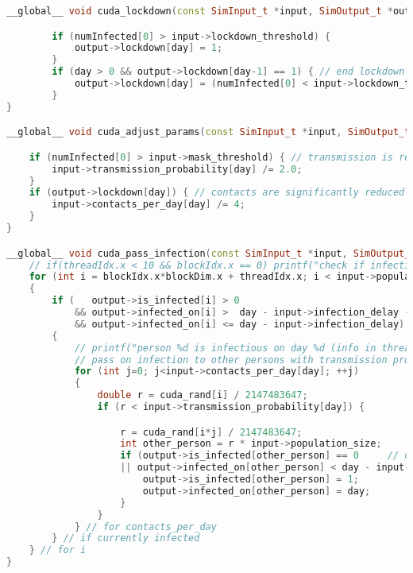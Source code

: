 \begin{lstlisting}[language=C++, title=C++ code for ]
__global__ void cuda_lockdown(const SimInput_t *input, SimOutput_t *output, int *numInfected, int day) {

        if (numInfected[0] > input->lockdown_threshold) {
            output->lockdown[day] = 1;
        }
        if (day > 0 && output->lockdown[day-1] == 1) { // end lockdown if number of infections has reduced significantly
            output->lockdown[day] = (numInfected[0] < input->lockdown_threshold / 3) ? 0 : 1;
        }
}

__global__ void cuda_adjust_params(const SimInput_t *input, SimOutput_t *output, int *numInfected, int day) {

    if (numInfected[0] > input->mask_threshold) { // transmission is reduced with masks. Arbitrary factor: 2
        input->transmission_probability[day] /= 2.0;
    }
    if (output->lockdown[day]) { // contacts are significantly reduced in lockdown. Arbitrary factor: 4
        input->contacts_per_day[day] /= 4;
    }
}

__global__ void cuda_pass_infection(const SimInput_t *input, SimOutput_t *output, u_int32_t *cuda_rand, int day){
    // if(threadIdx.x < 10 && blockIdx.x == 0) printf("check if infectious: person = %d, yes/no = %d\n", threadIdx.x, output->is_infected[threadIdx.x]);
    for (int i = blockIdx.x*blockDim.x + threadIdx.x; i < input->population_size; i += gridDim.x*blockDim.x)  // loop over population
    {
        if (   output->is_infected[i] > 0
            && output->infected_on[i] >  day - input->infection_delay - input->infection_days  // currently infected
            && output->infected_on[i] <= day - input->infection_delay)                         // already infectious
        {
            // printf("person %d is infectious on day %d (info in thread %d in block %d)\n", i, day, threadIdx.x, blockIdx.x);
            // pass on infection to other persons with transmission probability
            for (int j=0; j<input->contacts_per_day[day]; ++j) 
            {
                double r = cuda_rand[i] / 2147483647; 
                if (r < input->transmission_probability[day]) {

                    r = cuda_rand[i*j] / 2147483647;
                    int other_person = r * input->population_size;
                    if (output->is_infected[other_person] == 0     // other person is not infected
                    || output->infected_on[other_person] < day - input->immunity_duration) { // other person has no more immunity
                        output->is_infected[other_person] = 1;
                        output->infected_on[other_person] = day;
                    }
                }
            } // for contacts_per_day
        } // if currently infected
    } // for i
}
 

\end{lstlisting}
